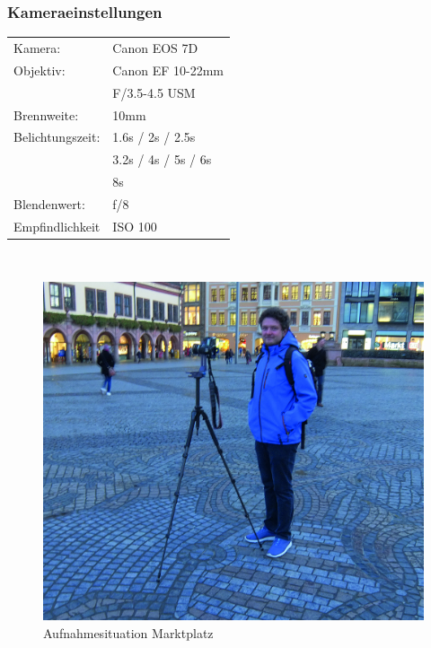 \documentclass[liststotoc,bibtotoc,fontsize=14pt,]{scrreprt}
\begin{document}
		\subsubsection{Kameraeinstellungen}
		\begin{minipage}{0.58\textwidth}
			\begin{tabular}{ll}
				Kamera: &Canon EOS 7D \\
				Objektiv: &Canon EF 10-22mm \\
				& F/3.5-4.5 USM\\		
				Brennweite:& 10mm \\
				Belichtungszeit: &1.6s / 2s / 2.5s \\
					& 3.2s / 4s / 5s / 6s \\
					& 8s \\
				Blendenwert: & f/8\\
				Empfindlichkeit & ISO 100 \\
			\end{tabular}\\
		\end{minipage}%
		\begin{minipage}{0.42\textwidth}
			\begin{figure}[H]
				\includegraphics[width=\linewidth]{img/places/mp.jpg}
				\caption{Aufnahmesituation Marktplatz}
				\label{img:mp}
			\end{figure}
		\end{minipage}%
		
\end{document}
